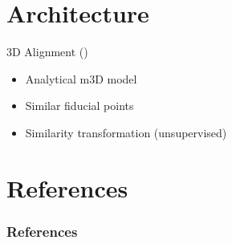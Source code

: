 \documentclass{beamer}
\begin{document}
\section{Architecture}

\begin{frame}{3D Alignment (\cite{taigman2014deepface})}

    \begin{itemize}
        \item Analytical m3D model
        \item Similar fiducial points
        \item Similarity transformation (unsupervised)
    \end{itemize}
\end{frame}



\section*{References}

\begin{frame}[allowframebreaks]\small
  \frametitle{References}
  \renewcommand*{\bibfont}{\footnotesize}
  \printbibliography
\end{frame}
\end{document}

